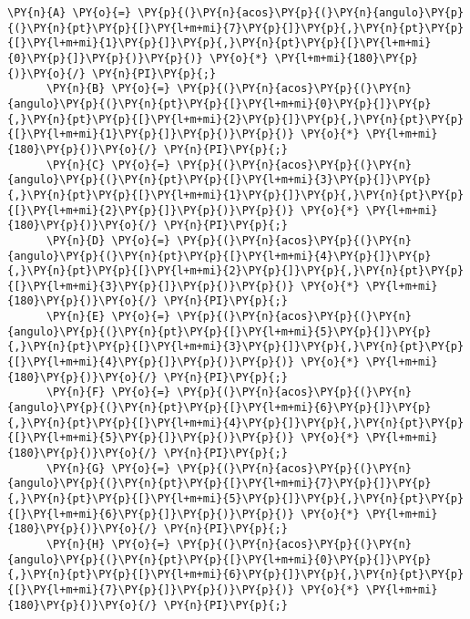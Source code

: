 \begin{Verbatim}[commandchars=\\\{\}]
      \PY{n}{A} \PY{o}{=} \PY{p}{(}\PY{n}{acos}\PY{p}{(}\PY{n}{angulo}\PY{p}{(}\PY{n}{pt}\PY{p}{[}\PY{l+m+mi}{7}\PY{p}{]}\PY{p}{,}\PY{n}{pt}\PY{p}{[}\PY{l+m+mi}{1}\PY{p}{]}\PY{p}{,}\PY{n}{pt}\PY{p}{[}\PY{l+m+mi}{0}\PY{p}{]}\PY{p}{)}\PY{p}{)} \PY{o}{*} \PY{l+m+mi}{180}\PY{p}{)}\PY{o}{/} \PY{n}{PI}\PY{p}{;} 
      \PY{n}{B} \PY{o}{=} \PY{p}{(}\PY{n}{acos}\PY{p}{(}\PY{n}{angulo}\PY{p}{(}\PY{n}{pt}\PY{p}{[}\PY{l+m+mi}{0}\PY{p}{]}\PY{p}{,}\PY{n}{pt}\PY{p}{[}\PY{l+m+mi}{2}\PY{p}{]}\PY{p}{,}\PY{n}{pt}\PY{p}{[}\PY{l+m+mi}{1}\PY{p}{]}\PY{p}{)}\PY{p}{)} \PY{o}{*} \PY{l+m+mi}{180}\PY{p}{)}\PY{o}{/} \PY{n}{PI}\PY{p}{;}
      \PY{n}{C} \PY{o}{=} \PY{p}{(}\PY{n}{acos}\PY{p}{(}\PY{n}{angulo}\PY{p}{(}\PY{n}{pt}\PY{p}{[}\PY{l+m+mi}{3}\PY{p}{]}\PY{p}{,}\PY{n}{pt}\PY{p}{[}\PY{l+m+mi}{1}\PY{p}{]}\PY{p}{,}\PY{n}{pt}\PY{p}{[}\PY{l+m+mi}{2}\PY{p}{]}\PY{p}{)}\PY{p}{)} \PY{o}{*} \PY{l+m+mi}{180}\PY{p}{)}\PY{o}{/} \PY{n}{PI}\PY{p}{;} 
      \PY{n}{D} \PY{o}{=} \PY{p}{(}\PY{n}{acos}\PY{p}{(}\PY{n}{angulo}\PY{p}{(}\PY{n}{pt}\PY{p}{[}\PY{l+m+mi}{4}\PY{p}{]}\PY{p}{,}\PY{n}{pt}\PY{p}{[}\PY{l+m+mi}{2}\PY{p}{]}\PY{p}{,}\PY{n}{pt}\PY{p}{[}\PY{l+m+mi}{3}\PY{p}{]}\PY{p}{)}\PY{p}{)} \PY{o}{*} \PY{l+m+mi}{180}\PY{p}{)}\PY{o}{/} \PY{n}{PI}\PY{p}{;}
      \PY{n}{E} \PY{o}{=} \PY{p}{(}\PY{n}{acos}\PY{p}{(}\PY{n}{angulo}\PY{p}{(}\PY{n}{pt}\PY{p}{[}\PY{l+m+mi}{5}\PY{p}{]}\PY{p}{,}\PY{n}{pt}\PY{p}{[}\PY{l+m+mi}{3}\PY{p}{]}\PY{p}{,}\PY{n}{pt}\PY{p}{[}\PY{l+m+mi}{4}\PY{p}{]}\PY{p}{)}\PY{p}{)} \PY{o}{*} \PY{l+m+mi}{180}\PY{p}{)}\PY{o}{/} \PY{n}{PI}\PY{p}{;}
      \PY{n}{F} \PY{o}{=} \PY{p}{(}\PY{n}{acos}\PY{p}{(}\PY{n}{angulo}\PY{p}{(}\PY{n}{pt}\PY{p}{[}\PY{l+m+mi}{6}\PY{p}{]}\PY{p}{,}\PY{n}{pt}\PY{p}{[}\PY{l+m+mi}{4}\PY{p}{]}\PY{p}{,}\PY{n}{pt}\PY{p}{[}\PY{l+m+mi}{5}\PY{p}{]}\PY{p}{)}\PY{p}{)} \PY{o}{*} \PY{l+m+mi}{180}\PY{p}{)}\PY{o}{/} \PY{n}{PI}\PY{p}{;}
      \PY{n}{G} \PY{o}{=} \PY{p}{(}\PY{n}{acos}\PY{p}{(}\PY{n}{angulo}\PY{p}{(}\PY{n}{pt}\PY{p}{[}\PY{l+m+mi}{7}\PY{p}{]}\PY{p}{,}\PY{n}{pt}\PY{p}{[}\PY{l+m+mi}{5}\PY{p}{]}\PY{p}{,}\PY{n}{pt}\PY{p}{[}\PY{l+m+mi}{6}\PY{p}{]}\PY{p}{)}\PY{p}{)} \PY{o}{*} \PY{l+m+mi}{180}\PY{p}{)}\PY{o}{/} \PY{n}{PI}\PY{p}{;}
      \PY{n}{H} \PY{o}{=} \PY{p}{(}\PY{n}{acos}\PY{p}{(}\PY{n}{angulo}\PY{p}{(}\PY{n}{pt}\PY{p}{[}\PY{l+m+mi}{0}\PY{p}{]}\PY{p}{,}\PY{n}{pt}\PY{p}{[}\PY{l+m+mi}{6}\PY{p}{]}\PY{p}{,}\PY{n}{pt}\PY{p}{[}\PY{l+m+mi}{7}\PY{p}{]}\PY{p}{)}\PY{p}{)} \PY{o}{*} \PY{l+m+mi}{180}\PY{p}{)}\PY{o}{/} \PY{n}{PI}\PY{p}{;}


\end{Verbatim}
